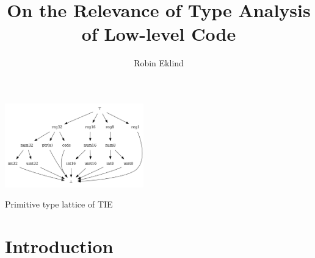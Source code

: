 \documentclass[10pt, a4paper, sigplan, authordraft]{acmart}
\title{On the Relevance of Type Analysis of Low-level Code}
\author{Robin Eklind}
\affiliation{
	\institution{Royal Institute of Technology (KTH)}
	\city{Stockholm}
	\country{Sweden}
}
\begin{document}





\begin{teaserfigure}
	\centering
	\includegraphics[width=0.45\textwidth]{inc/base_type_lattice.png}
	\caption{Primitive type lattice of TIE}
	\label{fig:base_type_lattice}
\end{teaserfigure}


\maketitle



\section{Introduction}

\end{document}

